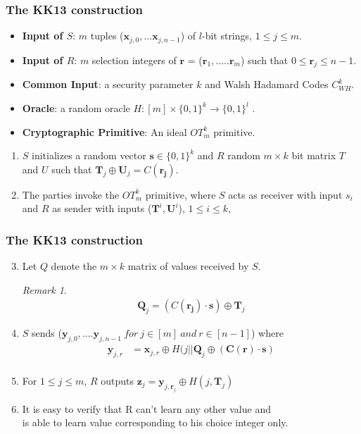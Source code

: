 \documentclass[hyperref={pdfpagelabels=false}]{beamer}
\theoremstyle{remark}
\newtheorem*{remark}{Remark}
\begin{document}
\begin{frame}
\frametitle{The KK13 construction}
\begin{itemize}
\item \textbf{Input of $S$}: $m$ tuples ($\mathbf{x}_{j,0},... \mathbf{x}_{j,n-1}$) of $l$-bit strings, $1 \leq j \leq m$. \pause
\item \textbf{Input of $R$}: $m$ selection integers of $\mathbf{r}$ = ($\mathbf{r}_1,.....\mathbf{r}_m$) such that $0 \leq \mathbf{r}_j \leq n-1$. \pause
\item \textbf{Common Input}: a security parameter $k$ and Walsh Hadamard Codes $C_{WH}^k$.\pause
\item \textbf{Oracle}: a random oracle $H : \left[m\right] \times \{0,1\}^k \rightarrow \{0,1\}^l$ . \pause
\item \textbf{Cryptographic Primitive}: An ideal $OT_m^k$ primitive.\pause
\end{itemize}
\begin{enumerate}
\item $S$ initializes a random vector $\mathbf{s} \in \{0,1\}^k$ and $R$ random $m \times k$ bit matrix $T$ and $U$ such that $\mathbf{T}_j \oplus \mathbf{U}_j = C(\mathbf{r_j})$. \pause
\item The parties invoke the $OT_m^k$ primitive, where $S$ acts as receiver with input $s_i$ and $R$ as sender with inputs ($\mathbf{T}^i, \mathbf{U}^i$), $1 \leq i \leq k$,
\end{enumerate}
\end{frame}

\begin{frame}
\frametitle{The KK13 construction}
\begin{enumerate}
\setcounter{enumi}{2}
\item Let $Q$ denote the $m \times k$ matrix of values received by $S$. \pause

\begin{remark}
\begin{align*}
\mathbf{Q}_j = (C(\mathbf{r_j}) \cdot \mathbf{s}) \oplus \mathbf{T}_j
\end{align*}
\end{remark}\pause

\item $S$ sends ($\mathbf{y}_{j,0},.... \mathbf{y}_{j,n-1} \ for \ j \in [m] \ and \ r \in [n-1] $) where \pause
\begin{align*}
\mathbf{y}_{j,r} &= \mathbf{x}_{j,r} \oplus H(j|| \mathbf{Q}_j \oplus (\mathbf{C(r)} \cdot \mathbf{s}) \\
\end{align*}
\item For $1 \leq j \leq m$, $R$ outputs $\mathbf{z}_{j} = \mathbf{y}_{j,\mathbf{r}_j} \oplus H(j, \mathbf{T}_{j})$\pause
\item It is easy to verify that R can't learn any other value and \\is able to learn value corresponding to his choice integer only.
\end{enumerate}
\end{frame}
\end{document}
